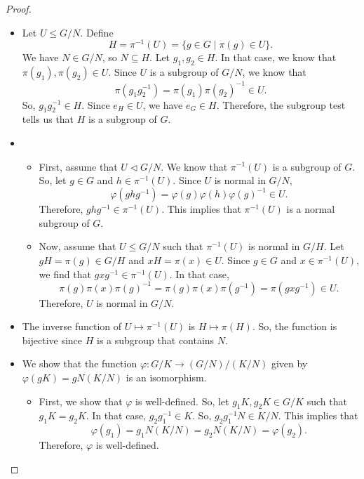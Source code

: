 \documentclass[a4paper, openany]{memoir}
\theoremstyle{definition}
\theoremstyle{plain}
\begin{document}
\begin{proof}
\hspace*{0pt}
\begin{itemize}
    \item Let $U \leqslant G/N$. Define
    \[H = \pi^{-1}(U) = \{g \in G \mid \pi(g) \in U\}.\]
    We have $N \in G/N$, so $N \subseteq H$. Let $g_1, g_2 \in H$. In that case, we know that $\pi(g_1), \pi(g_2) \in U$. Since $U$ is a subgroup of $G/N$, we know that
    \[\pi(g_1 g_2^{-1}) = \pi(g_1) \pi(g_2)^{-1} \in U.\]
    So, $g_1 g_2^{-1} \in H$. Since $e_H \in U$, we have $e_G \in H$. Therefore, the subgroup test tells us that $H$ is a subgroup of $G$.
    
    \item \begin{itemize}
        \item First, assume that $U \vartriangleleft G/N$. We know that $\pi^{-1}(U)$ is a subgroup of $G$. So, let $g \in G$ and $h \in \pi^{-1}(U)$. Since $U$ is normal in $G/N$,
        \[\varphi(ghg^{-1}) = \varphi(g) \varphi(h) \varphi(g)^{-1} \in U.\]
        Therefore, $ghg^{-1} \in \pi^{-1}(U)$. This implies that $\pi^{-1}(U)$ is a normal subgroup of $G$.
        
        \item Now, assume that $U \leqslant G/N$ such that $\pi^{-1}(U)$ is normal in $G/H$. Let $gH = \pi(g) \in G/H$ and $xH = \pi(x) \in U$. Since $g \in G$ and $x \in \pi^{-1}(U)$, we find that $gxg^{-1} \in \pi^{-1}(U)$. In that case,
        \[\pi(g) \pi(x) \pi(g)^{-1} = \pi(g) \pi(x) \pi(g^{-1}) = \pi(gxg^{-1}) \in U.\]
        Therefore, $U$ is normal in $G/N$.
    \end{itemize}
    
    \item The inverse function of $U \mapsto \pi^{-1}(U)$ is $H \mapsto \pi(H)$. So, the function is bijective since $H$ is a subgroup that contains $N$.
    
    \item We show that the function $\varphi: G/K \to (G/N)/(K/N)$ given by $\varphi(gK) = gN(K/N)$ is an isomorphism.
    \begin{itemize}
        \item First, we show that $\varphi$ is well-defined. So, let $g_1K, g_2K \in G/K$ such that $g_1K = g_2K$. In that case, $g_2 g_1^{-1} \in K$. So, $g_2 g_1^{-1}N \in K/N$. This implies that 
        \[\varphi(g_1) = g_1N(K/N) = g_2N(K/N) = \varphi(g_2).\]
        Therefore, $\varphi$ is well-defined.
        

\end{itemize}
\end{itemize}
\end{proof}
\end{document}
